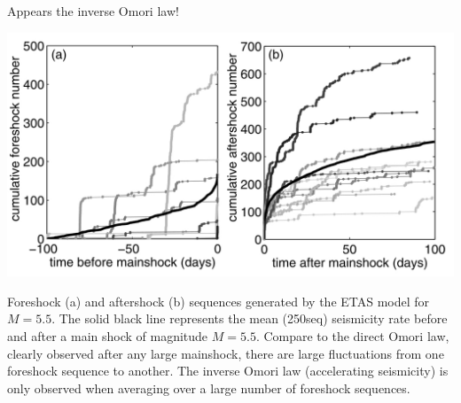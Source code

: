 \documentclass[aspectratio=43,9pt]{beamer}
\begin{document}
\begin{frame}
 {Appears the inverse Omori law!}
 
 \begin{center}
   \vspace{-20pt}
   \includegraphics[width=0.8\linewidth]{Figs/fig2} \\  
 \end{center}
  Foreshock (a) and aftershock (b) sequences generated by the ETAS model for $M=5.5$.
  The solid black line represents the mean (250seq) seismicity rate before and after a main 
  shock of magnitude $M = 5.5$. Compare to the direct Omori law, clearly observed after any 
  large mainshock, there are large fluctuations from one foreshock sequence to another. 
  The inverse Omori law (accelerating seismicity) is only observed when averaging over
  a large number of foreshock sequences.

 
\end{frame}
\end{document}
